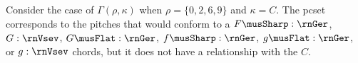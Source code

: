
Consider the case of $\Gamma(\rho, \kappa)$ when $\rho =
\{0, 2, 6, 9\}$ and $\kappa = C$. The \gls{pcset}
corresponds to the pitches that would conform to a
$F\musSharp:\rnGer$, $G:\rnVsev$, $G\musFlat:\rnGer$,
$f\musSharp:\rnGer$, $g\musFlat:\rnGer$, or $g:\rnVsev$
chords, but it does not have a relationship with the $C$.
